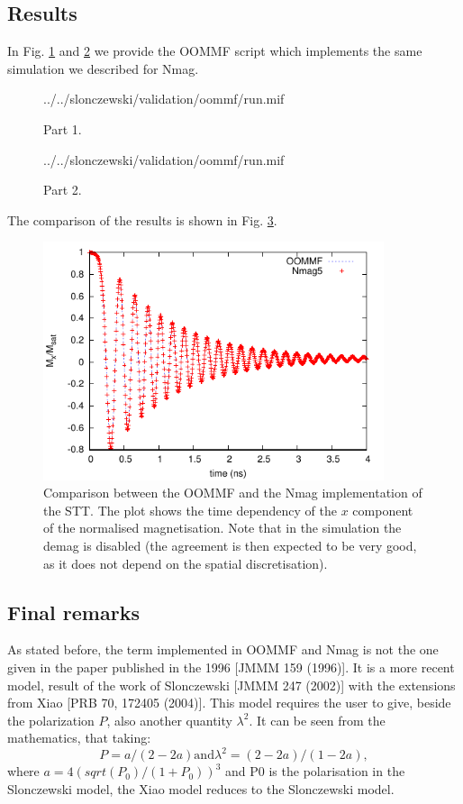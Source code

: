 \documentclass[11pt,oneside,openany]{article}
\begin{document}
%
%
%

\subsection{Results}
In Fig. \ref{fig:mif1of2} and \ref{fig:mif2of2} we provide the OOMMF script
which implements the same simulation we described for Nmag.

\begin{figure}[!p]
  {../../slonczewski/validation/oommf/run.mif}
\caption{Part 1.}
\label{fig:mif1of2}
\end{figure}

\begin{figure}[!h]
  {../../slonczewski/validation/oommf/run.mif}
\caption{Part 2.}
\label{fig:mif2of2}
\end{figure}

The comparison of the results is shown in Fig. \ref{fig:results}.

\begin{figure}[!h]
\includegraphics[width=10.0cm]{plot}
\caption{Comparison between the OOMMF and the Nmag implementation of the STT.
  The plot shows the time dependency of the $x$ component of the normalised
  magnetisation. Note that in the simulation the demag is disabled (the
  agreement is then expected to be very good, as it does not depend
  on the spatial discretisation).}
\label{fig:results}
\end{figure}

\subsection{Final remarks}
As stated before, the term implemented in OOMMF and Nmag is not the one
given in the paper published in the 1996 [JMMM 159 (1996)]. It is a more
recent model, result of the work of Slonczewski [JMMM 247 (2002)] with the
extensions from Xiao [PRB 70, 172405 (2004)]. This model requires the user
to give, beside the polarization $P$, also another quantity $\lambda^2$.
It can be seen from the mathematics, that taking:
$$
P = a/(2 - 2a) \mathrm{ and } \lambda^2 = (2 - 2a)/(1 - 2a),
$$
where $a = 4 (sqrt(P_0)/(1 + P_0))^3$ and P0 is the polarisation in the
Slonczewski model, the Xiao model reduces to the Slonczewski model.
\end{document}
